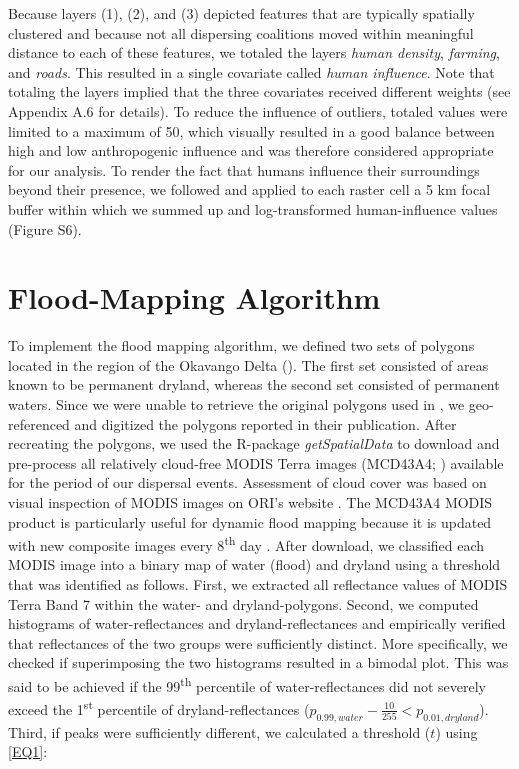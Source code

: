 \documentclass[abstract=off,10pt,a4paper,bibliography=totocnumbered]{article}
\begin{document}
\noindent Because layers (1), (2), and (3) depicted features that are typically
spatially clustered and because not all dispersing coalitions moved within
meaningful distance to each of these features, we totaled the layers
\textit{human density}, \textit{farming}, and \textit{roads}. This resulted in a
single covariate called \textit{human influence}. Note that totaling the layers
implied that the three covariates received different weights (see Appendix A.6
for details). To reduce the influence of outliers, totaled values were limited
to a maximum of 50, which visually resulted in a good balance between high and
low anthropogenic influence and was therefore considered appropriate for our
analysis. To render the fact that humans influence their surroundings beyond
their presence, we followed \cite{Elliot.2014} and applied to each raster cell a
5 km focal buffer within which we summed up and log-transformed human-influence
values (Figure S6).

\newpage
\section{Flood-Mapping Algorithm}
To implement the flood mapping algorithm, we defined two sets of polygons
located in the region of the Okavango Delta (). The first set
consisted of areas known to be permanent dryland, whereas the second set
consisted of permanent waters. Since we were unable to retrieve the original
polygons used in \cite{Wolski.2017}, we geo-referenced and digitized the
polygons reported in their publication. After recreating the polygons, we used
the R-package \textit{getSpatialData} \citep{Schwalb.2018} to download and
pre-process all relatively cloud-free MODIS Terra images (MCD43A4;
\citealp{Schaaf.2015}) available for the period of our dispersal events.
Assessment of cloud cover was based on visual inspection of MODIS images on
ORI's website \citep{ORI.2019}. The MCD43A4 MODIS product is particularly useful
for dynamic flood mapping because it is updated with new composite images every
8\textsuperscript{th} day \citep{Wolski.2017}. After download, we classified
each MODIS image into a binary map of water (flood) and dryland using a
threshold that was identified as follows. First, we extracted all reflectance
values of MODIS Terra Band 7 within the water- and dryland-polygons. Second, we
computed histograms of water-reflectances and dryland-reflectances and
empirically verified that reflectances of the two groups were sufficiently
distinct. More specifically, we checked if superimposing the two histograms
resulted in a bimodal plot. This was said to be achieved if the
99\textsuperscript{th} percentile of water-reflectances did not severely exceed
the 1\textsuperscript{st} percentile of dryland-reflectances (\(p_{0.99, water}
- \frac{10}{255} < p_{0.01, dryland}\)). Third, if peaks were sufficiently
different, we calculated a threshold (\(t\)) using \ref{EQ1}:
\end{document}
